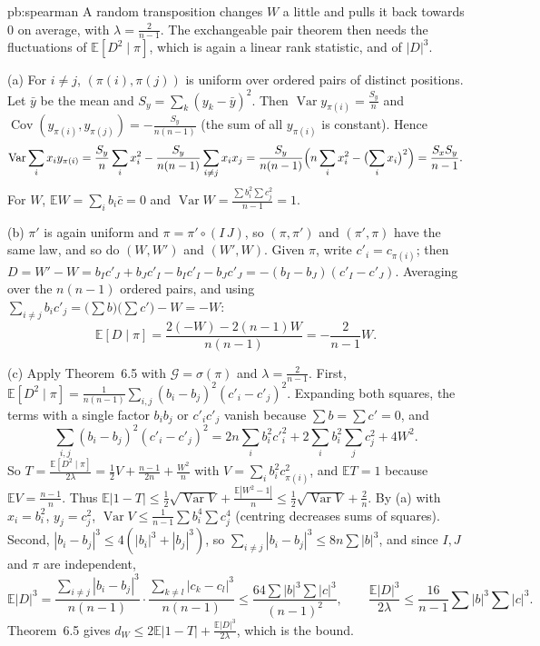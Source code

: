 \begin{solution}{pb:spearman}
\idea A random transposition changes $W$ a little and pulls it back towards $0$ on average, with $\lambda=\frac2{n-1}$. The exchangeable pair theorem then needs the
fluctuations of $\mathbb E[D^2\mid\pi]$, which is again a linear rank statistic, and of $|D|^3$.

\writeup (a) For $i\ne j$, $(\pi(i),\pi(j))$ is uniform over ordered pairs of distinct positions. Let $\bar y$ be the mean and $S_y=\sum_k(y_k-\bar y)^2$. Then
$\operatorname{Var}y_{\pi(i)}=\frac{S_y}n$ and $\operatorname{Cov}(y_{\pi(i)},y_{\pi(j)})=-\frac{S_y}{n(n-1)}$ (the sum of all $y_{\pi(i)}$ is constant). Hence
\[
\operatorname{Var}\sum_ix_iy_{\pi(i)}=\frac{S_y}n\sum_ix_i^2-\frac{S_y}{n(n-1)}\sum_{i\ne j}x_ix_j=\frac{S_y}{n(n-1)}\Bigl(n\sum_ix_i^2-\bigl(\sum_ix_i\bigr)^2\Bigr)=\frac{S_xS_y}{n-1}.
\]
For $W$, $\mathbb EW=\sum_ib_i\bar c=0$ and $\operatorname{Var}W=\frac{\sum b_i^2\sum c_j^2}{n-1}=1$.

(b) $\pi'$ is again uniform and $\pi=\pi'\circ(I\,J)$, so $(\pi,\pi')$ and $(\pi',\pi)$ have the same law, and so do $(W,W')$ and $(W',W)$. Given $\pi$, write $c'_i=c_{\pi(i)}$;
then $D=W'-W=b_Ic'_J+b_Jc'_I-b_Ic'_I-b_Jc'_J=-(b_I-b_J)(c'_I-c'_J)$. Averaging over the $n(n-1)$ ordered pairs, and using $\sum_{i\ne j}b_ic'_j=\bigl(\sum b\bigr)\bigl(\sum c'\bigr)-W=-W$:
\[
\mathbb E[D\mid\pi]=\frac{2(-W)-2(n-1)W}{n(n-1)}=-\frac2{n-1}W.
\]

(c) Apply Theorem~6.5 with $\mathcal G=\sigma(\pi)$ and $\lambda=\frac2{n-1}$. First,
$\mathbb E[D^2\mid\pi]=\frac1{n(n-1)}\sum_{i,j}(b_i-b_j)^2(c'_i-c'_j)^2$. Expanding both squares, the terms with a single factor $b_ib_j$ or $c'_ic'_j$ vanish because $\sum b=\sum c'=0$, and
\[
\sum_{i,j}(b_i-b_j)^2(c'_i-c'_j)^2=2n\sum_ib_i^2c'^2_i+2\sum_ib_i^2\sum_jc_j^2+4W^2.
\]
So $T=\frac{\mathbb E[D^2\mid\pi]}{2\lambda}=\frac12V+\frac{n-1}{2n}+\frac{W^2}n$ with $V=\sum_ib_i^2c_{\pi(i)}^2$, and $\mathbb ET=1$ because $\mathbb EV=\frac{n-1}n$. Thus
$\mathbb E|1-T|\le\frac12\sqrt{\operatorname{Var}V}+\frac{\mathbb E|W^2-1|}n\le\frac12\sqrt{\operatorname{Var}V}+\frac2n$. By (a) with $x_i=b_i^2$, $y_j=c_j^2$,
$\operatorname{Var}V\le\frac1{n-1}\sum b_i^4\sum c_j^4$ (centring decreases sums of squares). Second, $|b_i-b_j|^3\le4(|b_i|^3+|b_j|^3)$, so
$\sum_{i\ne j}|b_i-b_j|^3\le8n\sum|b|^3$, and since $I,J$ and $\pi$ are independent,
\[
\mathbb E|D|^3=\frac{\sum_{i\ne j}|b_i-b_j|^3}{n(n-1)}\cdot\frac{\sum_{k\ne l}|c_k-c_l|^3}{n(n-1)}\le\frac{64\sum|b|^3\sum|c|^3}{(n-1)^2},
\qquad\frac{\mathbb E|D|^3}{2\lambda}\le\frac{16}{n-1}\sum|b|^3\sum|c|^3.
\]
Theorem~6.5 gives $d_W\le2\mathbb E|1-T|+\frac{\mathbb E|D|^3}{2\lambda}$, which is the bound.


\end{solution}

